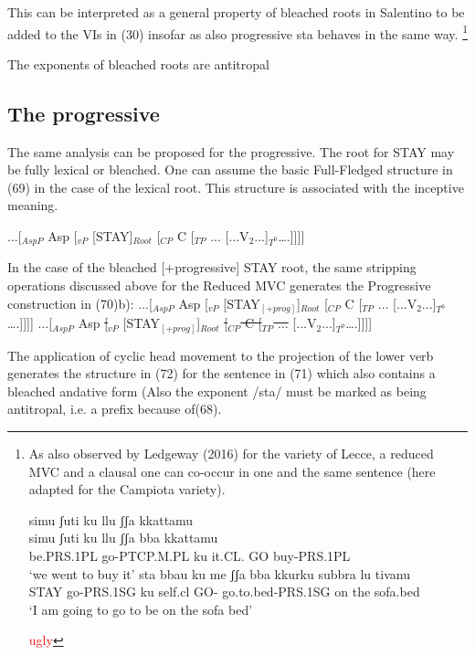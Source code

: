 \documentclass[output=paper,colorlinks,citecolor=brown,
]{langscibook}
\begin{document}
This can be interpreted as a general property of bleached roots in Salentino to be added to the VIs in (30) insofar as also progressive sta behaves in the same way. \footnote{As also observed by Ledgeway (2016) for the variety of Lecce, a reduced MVC and a clausal one can co-occur in one and the same sentence (here adapted for the Campiota variety). 

\ea
    \ea \gll simu      ʃuti        ku   llu     ʃʃa {} kkattamu\\
  simu      ʃuti       ku   llu    ʃʃa  bba kkattamu\\
be.PRS.1PL go-PTCP.M.PL  ku   it.CL.    GO  buy-PRS.1PL\\
\glt  ‘we went to buy it’
    \ex \gll sta   bbau     ku  me   ʃʃa bba kkurku      subbra lu tivanu\\
    STAY go-PRS.1SG ku  self.cl  GO- go.to.bed-PRS.1SG on  the sofa.bed\\
    \glt ‘I am going to go to be on the sofa bed’
    \z
\z

\textcolor{red}{ugly}

}

\ea
The exponents of bleached roots are antitropal
\z

\subsection{The progressive}

The same analysis can be proposed for the progressive.  The root for STAY may be fully lexical or bleached. One can assume the basic Full-Fledged structure in (69) in the case of the lexical root.  This structure is associated with the inceptive meaning.

\ea ...[$_{AspP}$ Asp [$_{vP}$ [STAY]$_{Root}$ [$_{CP}$ C [$_{TP}$ ... [...V$_2$...]$_{T^0}$….]]]]
\z


In the case of the bleached [+progressive] STAY root, the same stripping operations discussed above for the Reduced MVC generates the Progressive construction in (70)b):
\ea
    \ea ...[$_{AspP}$ Asp [$_{vP}$ [STAY$_{[+prog]}$]$_{Root}$ [$_{CP}$ C [$_{TP}$ ... [...V$_2$...]$_{T^0}$….]]]]
    \ex ...[$_{AspP}$ Asp \sout{[$_{vP}$} [STAY$_{[+prog]}$]$_{Root}$ \sout{[$_{CP}$ C [$_{TP}$ ...} [...V$_2$...]$_{T^0}$….]]]]
    \z
\z

The application of cyclic head movement to the projection of the lower verb generates the structure in (72) for the sentence in (71) which also contains a bleached andative form (Also the exponent /sta/ must be marked as being antitropal, i.e. a prefix because of(68). 
\end{document}
